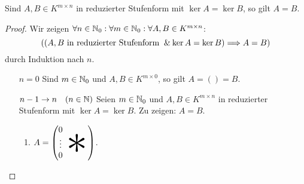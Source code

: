 \documentclass[../../main.tex]{subfiles}
\begin{document}
\begin{sat}\label{5.3.2}
Sind $A,B\in K^{m\times n}$ in reduzierter Stufenform mit $\ker A=\ker B$, so gilt $A=B$.
\end{sat}
\begin{proof}
Wir zeigen $\forall n\in \mathbb N_0:\forall m\in \mathbb N_0:\forall A,B\in K^{m\times n}$:
$$((A,B \text{ in reduzierter Stufenform }\mathbin{\&} \ker A=\ker B)\Longrightarrow A=B)$$
durch Induktion nach $n$.
\begin{itemize}
\item[\underline{$n=0$}] Sind $m\in\mathbb N_0$ und $A,B\in K^{m\times 0}$, so gilt $A=()=B$.
\item[\underline{$n-1\to n\quad(n\in\mathbb N)$}] Seien $m\in \mathbb N_0$ und $A,B\in K^{m\times n}$ in reduzierter Stufenform mit $\ker A=\ker B$. Zu zeigen: $A=B$.
\begin{enumerate}[{Fall }1:]
\item
$A=\begin{pmatrix}0&&&\\\vdots&&
\begin{tikzpicture}[overlay]\node[xshift=-0.3em,yshift=0.5em,scale=5]{$*$};\end{tikzpicture}&\\
0&&&
\end{pmatrix}$.


\end{enumerate}
\end{itemize}
\end{proof}
\end{document}
